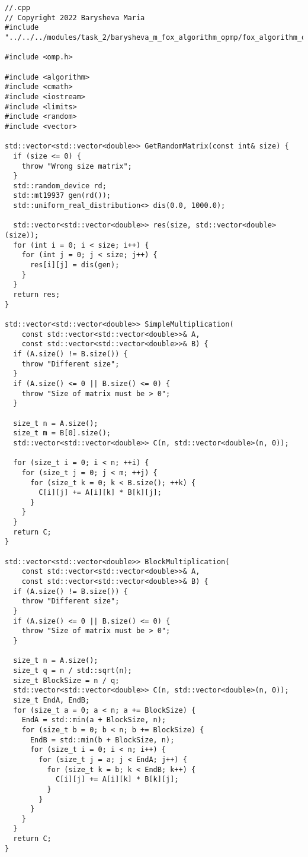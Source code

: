 \documentclass[12pt]{article}
\begin{document}
\begin{lstlisting}
//.cpp
// Copyright 2022 Barysheva Maria
#include "../../../modules/task_2/barysheva_m_fox_algorithm_opmp/fox_algorithm_opmp.h"

#include <omp.h>

#include <algorithm>
#include <cmath>
#include <iostream>
#include <limits>
#include <random>
#include <vector>

std::vector<std::vector<double>> GetRandomMatrix(const int& size) {
  if (size <= 0) {
    throw "Wrong size matrix";
  }
  std::random_device rd;
  std::mt19937 gen(rd());
  std::uniform_real_distribution<> dis(0.0, 1000.0);

  std::vector<std::vector<double>> res(size, std::vector<double>(size));
  for (int i = 0; i < size; i++) {
    for (int j = 0; j < size; j++) {
      res[i][j] = dis(gen);
    }
  }
  return res;
}

std::vector<std::vector<double>> SimpleMultiplication(
    const std::vector<std::vector<double>>& A,
    const std::vector<std::vector<double>>& B) {
  if (A.size() != B.size()) {
    throw "Different size";
  }
  if (A.size() <= 0 || B.size() <= 0) {
    throw "Size of matrix must be > 0";
  }

  size_t n = A.size();
  size_t m = B[0].size();
  std::vector<std::vector<double>> C(n, std::vector<double>(n, 0));

  for (size_t i = 0; i < n; ++i) {
    for (size_t j = 0; j < m; ++j) {
      for (size_t k = 0; k < B.size(); ++k) {
        C[i][j] += A[i][k] * B[k][j];
      }
    }
  }
  return C;
}

std::vector<std::vector<double>> BlockMultiplication(
    const std::vector<std::vector<double>>& A,
    const std::vector<std::vector<double>>& B) {
  if (A.size() != B.size()) {
    throw "Different size";
  }
  if (A.size() <= 0 || B.size() <= 0) {
    throw "Size of matrix must be > 0";
  }

  size_t n = A.size();
  size_t q = n / std::sqrt(n);
  size_t BlockSize = n / q;
  std::vector<std::vector<double>> C(n, std::vector<double>(n, 0));
  size_t EndA, EndB;
  for (size_t a = 0; a < n; a += BlockSize) {
    EndA = std::min(a + BlockSize, n);
    for (size_t b = 0; b < n; b += BlockSize) {
      EndB = std::min(b + BlockSize, n);
      for (size_t i = 0; i < n; i++) {
        for (size_t j = a; j < EndA; j++) {
          for (size_t k = b; k < EndB; k++) {
            C[i][j] += A[i][k] * B[k][j];
          }
        }
      }
    }
  }
  return C;
}


\end{lstlisting}
\end{document}
